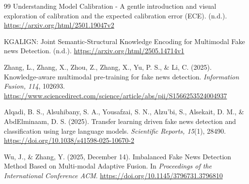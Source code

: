 \begin{thebibliography}{99}
Understanding Model Calibration - A gentle introduction and visual exploration of calibration and the expected calibration error (ECE). (n.d.). \url{https://arxiv.org/html/2501.19047v2}

KGALIGN: Joint Semantic-Structural Knowledge Encoding for Multimodal Fake news Detection. (n.d.). \url{https://arxiv.org/html/2505.14714v1}

Zhang, L., Zhang, X., Zhou, Z., Zhang, X., Yu, P. S., \& Li, C. (2025). Knowledge-aware multimodal pre-training for fake news detection. \textit{Information Fusion, 114}, 102693. \url{https://www.sciencedirect.com/science/article/abs/pii/S1566253524004937}

Alqadi, B. S., Alsuhibany, S. A., Yousafzai, S. N., Alzu'bi, S., Alsekait, D. M., \& AbdElminaam, D. S. (2025). Transfer learning driven fake news detection and classification using large language models. \textit{Scientific Reports, 15}(1), 28490. \url{https://doi.org/10.1038/s41598-025-10670-2}

Wu, J., \& Zhang, Y. (2025, December 14). Imbalanced Fake News Detection Method Based on Multi-modal Adaptive Fusion. In \textit{Proceedings of the International Conference ACM}. \url{https://doi.org/10.1145/3796731.3796810}

\end{thebibliography}
\endgroup